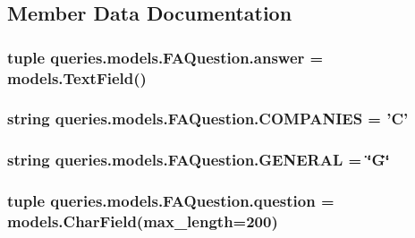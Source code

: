 \subsection{Member Data Documentation}
\hypertarget{classqueries_1_1models_1_1_f_a_question_a993b5b7860c718d2912e5237cc6b8ed5}{
\subsubsection[{answer}]{\setlength{\rightskip}{0pt plus 5cm}tuple queries.\-models.\-F\-A\-Question.\-answer = models.\-Text\-Field()\hspace{0.3cm}{\ttfamily [static]}}}\label{classqueries_1_1models_1_1_f_a_question_a993b5b7860c718d2912e5237cc6b8ed5}
\hypertarget{classqueries_1_1models_1_1_f_a_question_ac8a38c591891ee425e8feecc74cd2678}{
\subsubsection[{C\-O\-M\-P\-A\-N\-I\-E\-S}]{\setlength{\rightskip}{0pt plus 5cm}string queries.\-models.\-F\-A\-Question.\-C\-O\-M\-P\-A\-N\-I\-E\-S = '{\bf C}'\hspace{0.3cm}{\ttfamily [static]}}}\label{classqueries_1_1models_1_1_f_a_question_ac8a38c591891ee425e8feecc74cd2678}
\hypertarget{classqueries_1_1models_1_1_f_a_question_a2f8e70ef9eefe790efcadd6f7aa6467b}{
\subsubsection[{G\-E\-N\-E\-R\-A\-L}]{\setlength{\rightskip}{0pt plus 5cm}string queries.\-models.\-F\-A\-Question.\-G\-E\-N\-E\-R\-A\-L = \char`\"{}G\char`\"{}\hspace{0.3cm}{\ttfamily [static]}}}\label{classqueries_1_1models_1_1_f_a_question_a2f8e70ef9eefe790efcadd6f7aa6467b}
\hypertarget{classqueries_1_1models_1_1_f_a_question_aeb9a06018cf2c003de403276063c620e}{
\subsubsection[{question}]{\setlength{\rightskip}{0pt plus 5cm}tuple queries.\-models.\-F\-A\-Question.\-question = models.\-Char\-Field(max\-\_\-length=200)\hspace{0.3cm}{\ttfamily [static]}}}\label{classqueries_1_1models_1_1_f_a_question_aeb9a06018cf2c003de403276063c620e}
